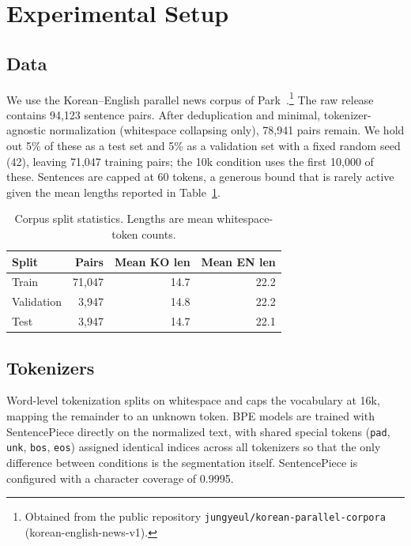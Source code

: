 \documentclass[conference]{IEEEtran}
\begin{document}
\section{Experimental Setup}
\subsection{Data}
We use the Korean--English parallel news corpus of
Park~\cite{park-corpus}.\footnote{Obtained from the public repository
\texttt{jungyeul/korean-parallel-corpora} (korean-english-news-v1).} The raw
release contains 94{,}123 sentence pairs. After deduplication and minimal,
tokenizer-agnostic normalization (whitespace collapsing only), 78{,}941 pairs
remain. We hold out 5\% of these as a test set and 5\% as a validation set with a
fixed random seed (42), leaving 71{,}047 training pairs; the 10k condition uses
the first 10{,}000 of these. Sentences are capped at 60 tokens, a generous bound
that is rarely active given the mean lengths reported in Table~\ref{tab:data}.

\begin{table}[t]
\caption{Corpus split statistics. Lengths are mean whitespace-token counts.}
\label{tab:data}
\centering
\begin{tabular}{lrrr}
\toprule
Split & Pairs & Mean KO len & Mean EN len \\
\midrule
Train      & 71{,}047 & 14.7 & 22.2 \\
Validation &  3{,}947 & 14.8 & 22.2 \\
Test       &  3{,}947 & 14.7 & 22.1 \\
\bottomrule
\end{tabular}
\end{table}

\subsection{Tokenizers}
Word-level tokenization splits on whitespace and caps the vocabulary at 16k,
mapping the remainder to an unknown token. BPE models are trained with
SentencePiece directly on the normalized text, with shared special tokens
(\texttt{pad}, \texttt{unk}, \texttt{bos}, \texttt{eos}) assigned identical
indices across all tokenizers so that the only difference between conditions is
the segmentation itself. SentencePiece is configured with a character coverage
of 0.9995.
\end{document}
